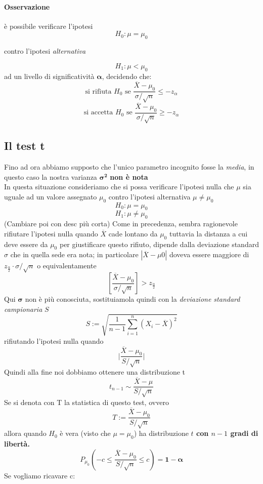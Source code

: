 \documentclass[]{article}
\begin{document}
    \paragraph{Osservazione} è possibile verificare l'ipotesi
    \[ H_0 : \mu = \mu_0 \]
    \centerline{contro l'ipotesi \textit{alternativa}}
    \[ H_1 : \mu < \mu_0 \]
    ad un livello di significatività $\boldsymbol{\alpha}$, decidendo che:
    \[ \text{si rifiuta } H_0 \text{ se } \frac{\overline{X} - \mu_0}{\sigma / \sqrt{n}} \leq -z_\alpha \]
    \[ \text{si accetta } H_0 \text{ se } \frac{\overline{X} - \mu_0}{\sigma / \sqrt{n}} \geq -z_\alpha \]
    \subsection{Il test t}
    Fino ad ora abbiamo supposto che l'unico parametro incognito fosse la \textit{media}, in questo caso la nostra varianza $\boldsymbol{\sigma^2}$ \textbf{non è nota} \\
    In questa situazione consideriamo che si possa verificare l'ipotesi nulla che $\mu$ sia uguale ad un valore assegnato $\mu_0$ contro l'ipotesi alternativa $\mu \not= \mu_0$
    \[ H_0 : \mu = \mu_0 \]
    \[ H_1 : \mu \not= \mu_0 \]
    (Cambiare poi con desc più corta)
    Come in precedenza, sembra ragionevole rifiutare l’ipotesi nulla quando $\overline{X}$ cade
    lontano da $\mu_0$ tuttavia la distanza a cui deve essere da $\mu_0$ per giustificare questo
    rifiuto, dipende dalla deviazione standard $\sigma$ che in quella sede era nota; in particolare
    $|\overline{X} - \mu0|$ doveva essere maggiore di $z_{\frac{\alpha}{2}} \cdot \sigma / \sqrt{n}$ o equivalentamente
    \[ \left[ \frac{\overline{X} - \mu_0}{\sigma / \sqrt{n}} \right] > z_{\frac{\alpha}{2}} \]
    Qui $\boldsymbol{\sigma}$ non è più conosciuta, sostituiamola quindi con la \textit{deviazione standard campionaria} $S$
    \[ S := \sqrt{\frac{1}{n-1} \sum_{i=1}^{n} (X_i - \overline{X})^2} \]
    rifiutando l'ipotesi nulla quando 
    \[ \big\rvert \frac{\overline{X} - \mu_0}{S / \sqrt{n}} \big\rvert \] 
    Quindi alla fine noi dobbiamo ottenere una distribuzione t
    \[  t_{n-1} \sim \frac{\overline{X} - \mu}{S/ \sqrt{n}} \]
    Se si denota con T la statistica di questo test, ovvero 
    \[ T := \frac{\overline{X} - \mu_0}{S / \sqrt{n}} \]
    allora quando $H_0$ è vera (visto che $\mu = \mu_0$) ha distribuzione \textbf{$t$ con $n-1$ gradi di libertà.}
    \[ P_{\mu_0} \left( - c \leq \frac{\overline{X} - \mu_0}{S / \sqrt{n}} \leq c \right) = \boldsymbol{1- \alpha} \]
    Se vogliamo ricavare c:
\end{document}
